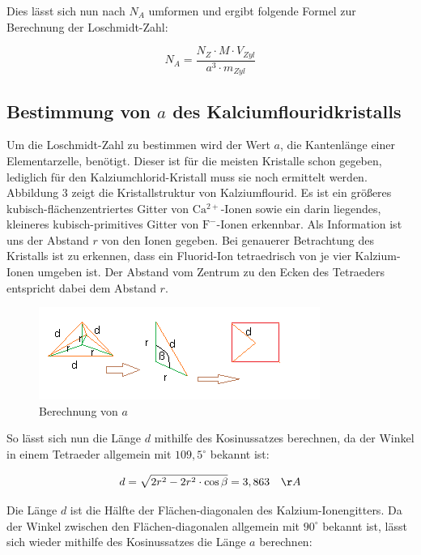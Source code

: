 \documentclass[12pt,a4paper,titlepage,headinclude,bibtotoc]{scrartcl}
\begin{document}
Dies lässt sich nun nach $N_A$ umformen und ergibt folgende Formel zur Berechnung der Loschmidt-Zahl:

\begin{equation}
N_A= \frac{N_Z \cdot M \cdot V_{Zyl}}{a^3 \cdot m_{Zyl}}
\end{equation}

\subsection{Bestimmung von $a$ des Kalciumflouridkristalls}
 
Um die Loschmidt-Zahl zu bestimmen wird der Wert $a$, die Kantenlänge einer Elementarzelle, benötigt. Dieser ist für die meisten Kristalle schon gegeben, lediglich für den Kalziumchlorid-Kristall muss sie noch ermittelt werden. Abbildung 3 zeigt die Kristallstruktur von Kalziumflourid. Es ist ein größeres kubisch-flächenzentriertes Gitter von $ \mathrm {Ca^{2+}}$-Ionen sowie ein darin liegendes, kleineres kubisch-primitives Gitter von $ \mathrm{F^-}$-Ionen erkennbar. Als Information ist uns der Abstand $r$ von den Ionen gegeben. Bei genauerer Betrachtung des Kristalls ist zu erkennen, dass ein Fluorid-Ion tetraedrisch von je vier Kalzium-Ionen umgeben ist. Der Abstand vom Zentrum zu den Ecken des Tetraeders entspricht dabei dem Abstand $r$.

\begin{figure} [h]
\begin{center}
\includegraphics[scale=1]{a.png} \end{center}
\caption{Berechnung von $a$}
\end{figure} 

So lässt sich nun die Länge $d$ mithilfe des Kosinussatzes berechnen, da der Winkel in einem Tetraeder allgemein mit $109,5^\circ$ bekannt ist:

\begin{equation}
 d = \sqrt{2r^2-2r^2 \cdot \cos \beta } = 3, 863 \quad \AA
\end{equation}     

Die Länge $d$ ist die Hälfte der Flächen-diagonalen des Kalzium-Ionengitters. Da der Winkel zwischen den Flächen-diagonalen allgemein mit $ 90^\circ $ bekannt ist, lässt sich wieder mithilfe des Kosinussatzes die Länge $a$ berechnen:
\end{document}
